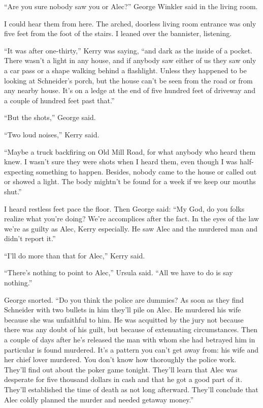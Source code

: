 {“Are you sure nobody saw you or Alec?” George Winkler said in the living room.

I could hear them from here. The arched, doorless living room entrance was only five feet from the foot of the stairs. I leaned over the bannister, listening.

“It was after one-thirty,” Kerry was saying, “and dark as the inside of a pocket. There wasn’t a light in any house, and if anybody saw either of us they saw only a car pass or a shape walking behind a flashlight. Unless they happened to be looking at Schneider’s porch, but the house can’t be seen from the road or from any nearby house. It’s on a ledge at the end of five hundred feet of driveway and a couple of hundred feet past that.”

“But the shots,” George said.

“Two loud noises,” Kerry said.

“Maybe a truck backfiring on Old Mill Road, for what anybody who heard them knew. I wasn’t sure they were shots when I heard them, even though I was half-expecting something to happen. Besides, nobody came to the house or called out or showed a light. The body mightn’t be found for a week if we keep our mouths shut.”

I heard restless feet pace the floor. Then George said: “My God, do you folks realize what you’re doing? We’re accomplices after the fact. In the eyes of the law we’re as guilty as Alec, Kerry especially. He saw Alec and the murdered man and didn’t report it.”

“I’ll do more than that for Alec,” Kerry said.

“There’s nothing to point to Alec,” Ursula said. “All we have to do is say nothing.”

George snorted. “Do you think the police are dummies? As soon as they find Schneider with two bullets in him they’ll pile on Alec. He murdered his wife because she was unfaithful to him. He was acquitted by the jury not because there was any doubt of his guilt, but because of extenuating circumstances. Then a couple of days after he’s released the man with whom she had betrayed him in particular is found murdered. It’s a pattern you can’t get away from: his wife and her chief lover murdered. You don’t know how thoroughly the police work. They’ll find out about the poker game tonight. They’ll learn that Alec was desperate for five thousand dollars in cash and that he got a good part of it. They’ll established the time of death as not long afterward. They’ll conclude that Alec coldly planned the murder and needed getaway money.”

}
